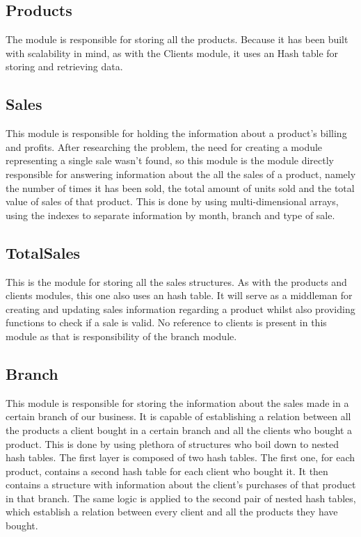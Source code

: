 \documentclass[a4paper]{report}
\begin{document}
\subsection{Products}

The module is responsible for storing all the products. Because it has been built
with scalability in mind, as with the Clients module,
it uses an Hash table for storing and retrieving data.

\subsection{Sales}

This module is responsible for holding the information about a product's billing and profits.
After researching the problem, the need for creating a module representing a single sale wasn't found,
so this module is the module directly responsible for answering information about the all the sales of a product,
namely the number of times it has been sold, the total amount of units sold and the total value
of sales of that product. This is done by using multi-dimensional arrays, 
using the indexes to separate information by month, branch and type of sale. 

\subsection{TotalSales}

This is the module for storing all the sales structures. As with the products
and clients modules, this one also uses an hash table. It will serve as a middleman 
for creating and updating sales information regarding a product whilst also providing functions to check if a sale is valid.
No reference to clients is present in this module as that is responsibility of the branch module.


\subsection{Branch}

This module is responsible for storing the information about the sales made in a certain
branch of our business. It is capable of establishing a relation between all the products a client bought in a certain
branch and all the clients who bought a product.
This is done by using plethora of structures who boil down to nested hash tables.
The first layer is composed of two hash tables. The first one, for each product, contains a second hash table for each
client who bought it. It then contains a structure with information about the client's purchases of that product in that branch.
The same logic is applied to the second pair of nested hash tables, which establish a relation between 
every client and all the products they have bought.
\end{document}
